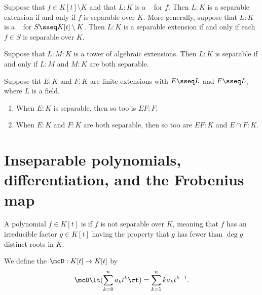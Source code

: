 \documentclass{article}
\begin{document}
  \begin{tcorollary}
    Suppose that $ f\in K[t]\setminus K $ and that $ L:K $ is a \sfe~ for $ f $.
    Then $ L:K $ is a separable extension if and only if $ f $ is separable over $ K $.
    More generally, suppose that $ L:K $ is a \sfe~ for $ S\sseq K[t]\setminus K $.
    Then $ L:K $ is a separable extension if and only if each $ f\in S $ is separable over $ K $.
  \end{tcorollary}

  \begin{ttheorem}
    Suppose that $ L:M:K $ is a tower of algebraic extensions.
    Then $ L:K $ is separable if and only if $ L:M $ and $ M:K $ are both separable.
  \end{ttheorem}

  \begin{ttheorem}
    Suppose tht $ E:K $ and $ F:K $ are finite extensions with $ E\sseq L $ and $ F\sseq L $, where $ L $ is a field.
    \begin{enumerate}[label=(\alph*)]
      \item When $ E:K $ is separable, then so too is $ EF:F $;
      \item When $ E:K $ and $ F:K $ are both separable, then so too are $ EF:K $ and $ E\cap F:K $.
    \end{enumerate}
  \end{ttheorem}

\section{Inseparable polynomials, differentiation, and the Frobenius map}
  \begin{tdefinition}[Inseparable]
    A polynomial $f \in K[t]$ is  if $f$ is not separable over $K$, meaning that $f$ has an irreducible factor $g \in K[t]$ having the property that $g$ has fewer than $\deg g$ distinct roots in $K$.
  \end{tdefinition}

  \begin{tdefinition}
    We define the  $ \mcD:K[t]\to K[t] $ by \begin{align*}
      \mcD\lt(\sum_{k=0}^{n}a_kt^k\rt) = \sum_{k=1}^{n}ka_kt^{k-1}.
    \end{align*}
  \end{tdefinition}
\end{document}
